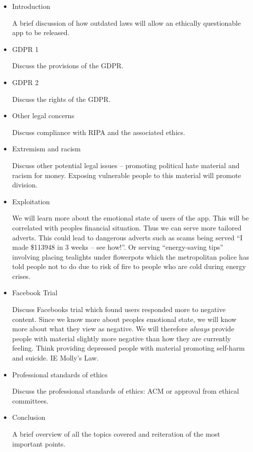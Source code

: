 \documentclass[10pt,\jkfside,a4paper]{article}
\begin{document}
\begin{itemize}

\item Introduction

A brief discussion of how outdated laws will allow an ethically questionable
app to be released.

\item GDPR 1

Discuss the provisions of the GDPR.

\item GDPR 2

Discuss the rights of the GDPR.

\item Other legal concerns

Discuss compliance with RIPA and the associated ethics.

\item Extremism and racism

Discuss other potential legal issues -- promoting political hate material and
racism for money. Exposing vulnerable people to this material will promote
division.

\item Exploitation

We will learn more about the emotional state of users of the app. This will
be correlated with peoples financial situation. Thus we can serve more
tailored adverts. This could lead to dangerous adverts such as scams being
served ``I made \$113948 in 3 weeks -- see how!''. Or serving
``energy-saving tips'' involving placing tealights under flowerpots which the
metropolitan police has told people not to do due to risk of fire to people
who are cold during energy crises.

\item Facebook Trial

Discuss Facebooks trial which found users responded more to negative content.
Since we know more about peoples emotional state, we will know more about
what they view as negative. We will therefore \textit{always} provide people
with material slightly more negative than how they are currently feeling.
Think providing depressed people with material promoting self-harm and
suicide. IE Molly's Law.

\item Professional standards of ethics

Discuss the professional standards of ethics: ACM or approval from ethical
committees.

\item Conclusion

A brief overview of all the topics covered and reiteration of the most
important points.

\end{itemize}
\end{document}
